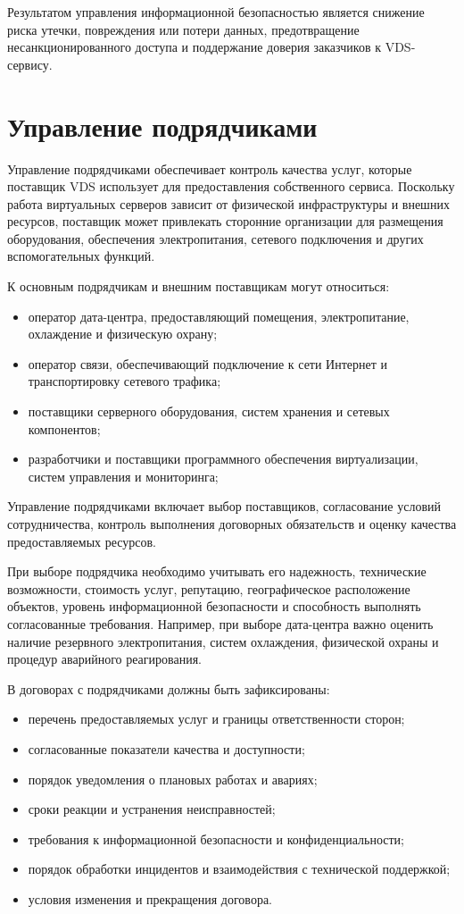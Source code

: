 \documentclass[14pt,a4paper]{extarticle}
\begin{document}
Результатом управления информационной безопасностью является снижение риска
утечки, повреждения или потери данных, предотвращение несанкционированного доступа
и поддержание доверия заказчиков к VDS-сервису.

\section{Управление подрядчиками}

Управление подрядчиками обеспечивает контроль качества услуг, которые поставщик
VDS использует для предоставления собственного сервиса. Поскольку работа
виртуальных серверов зависит от физической инфраструктуры и внешних ресурсов,
поставщик может привлекать сторонние организации для размещения оборудования,
обеспечения электропитания, сетевого подключения и других вспомогательных функций.

К основным подрядчикам и внешним поставщикам могут относиться:
\begin{itemize}
    \item оператор дата-центра, предоставляющий помещения, электропитание,
    охлаждение и физическую охрану;
    \item оператор связи, обеспечивающий подключение к сети Интернет и
    транспортировку сетевого трафика;
    \item поставщики серверного оборудования, систем хранения и сетевых
    компонентов;
    \item разработчики и поставщики программного обеспечения виртуализации,
    систем управления и мониторинга;
\end{itemize}

Управление подрядчиками включает выбор поставщиков, согласование условий
сотрудничества, контроль выполнения договорных обязательств и оценку качества
предоставляемых ресурсов.

При выборе подрядчика необходимо учитывать его надежность, технические
возможности, стоимость услуг, репутацию, географическое расположение объектов,
уровень информационной безопасности и способность выполнять согласованные
требования. Например, при выборе дата-центра важно оценить наличие резервного
электропитания, систем охлаждения, физической охраны и процедур аварийного
реагирования.

В договорах с подрядчиками должны быть зафиксированы:
\begin{itemize}
    \item перечень предоставляемых услуг и границы ответственности сторон;
    \item согласованные показатели качества и доступности;
    \item порядок уведомления о плановых работах и авариях;
    \item сроки реакции и устранения неисправностей;
    \item требования к информационной безопасности и конфиденциальности;
    \item порядок обработки инцидентов и взаимодействия с технической поддержкой;
    \item условия изменения и прекращения договора.
\end{itemize}
\end{document}
